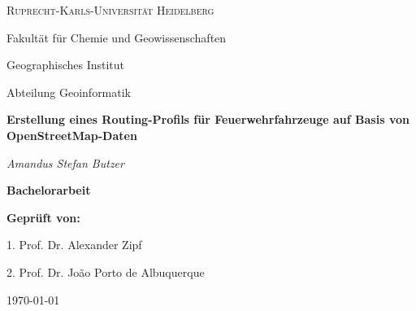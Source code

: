 \begin{titlepage}
\begin{center}

	{\scshape\LARGE Ruprecht-Karls-Universität Heidelberg\par}
	\vspace{1.0cm}
	{\large Fakultät für Chemie und Geowissenschaften \par Geographisches Institut \par Abteilung Geoinformatik\par}
	\vspace{2.5cm}
	{\Huge\bfseries Erstellung eines Routing-Profils für Feuerwehrfahrzeuge auf Basis von OpenStreetMap-Daten\par}
	\vspace{2cm}
	{\Large\itshape Amandus Stefan Butzer\par}
	\vspace{2cm}
	{\LARGE\bfseries Bachelorarbeit\par}
	
	\vfill
	{\bfseries Geprüft von:}
	{\par 1. Prof. Dr. Alexander Zipf}
	{\par 2. Prof. Dr. Jo\~ao Porto de Albuquerque}

	\vfill

	{\large \today\par}
\end{center}
\end{titlepage}